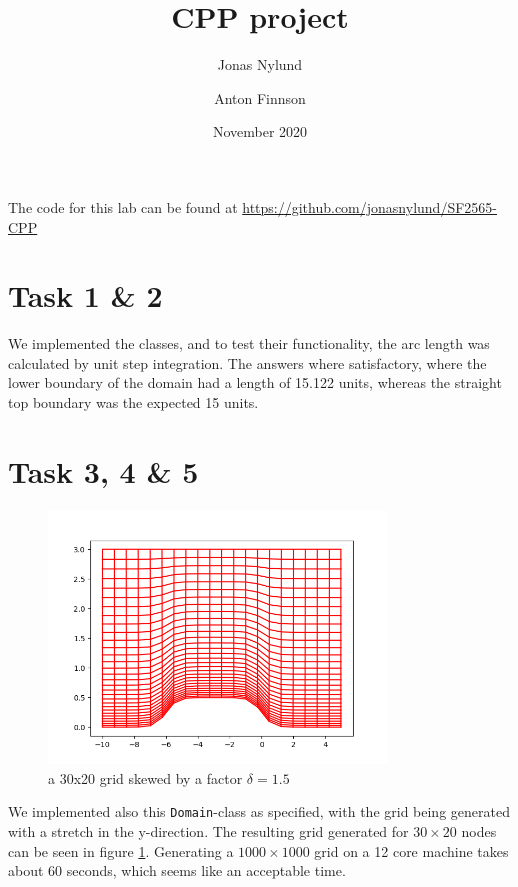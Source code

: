 \documentclass[12pt]{article}
\title{CPP project }
\author{Jonas Nylund \and Anton Finnson}
\date{November 2020}
\begin{document}
\maketitle

The code for this lab can be found at \href{https://github.com/jonasnylund/SF2565-CPP}{https://github.com/jonasnylund/SF2565-CPP}

% 

\section{Task 1 \& 2}
We implemented the classes, and to test their functionality, the arc length was calculated by unit step integration. The answers where satisfactory, where the lower boundary of the domain had a length of 15.122 units, whereas the straight top boundary was the expected 15 units.

\section{Task 3, 4 \& 5}

\begin{figure}[t]
    \centering
    \includegraphics[width=0.8\textwidth]{lab3/Figure1.png}
    \caption{a 30x20 grid skewed by a factor $\delta=1.5$}
    \label{fig:grid}
\end{figure}

We implemented also this \texttt{Domain}-class as specified, with the grid being generated with a stretch in the y-direction. The resulting grid generated for $30\times 20$ nodes can be seen in figure \ref{fig:grid}. Generating a $1000\times 1000$ grid on a 12 core machine takes about 60 seconds, which seems like an acceptable time.
\end{document}
